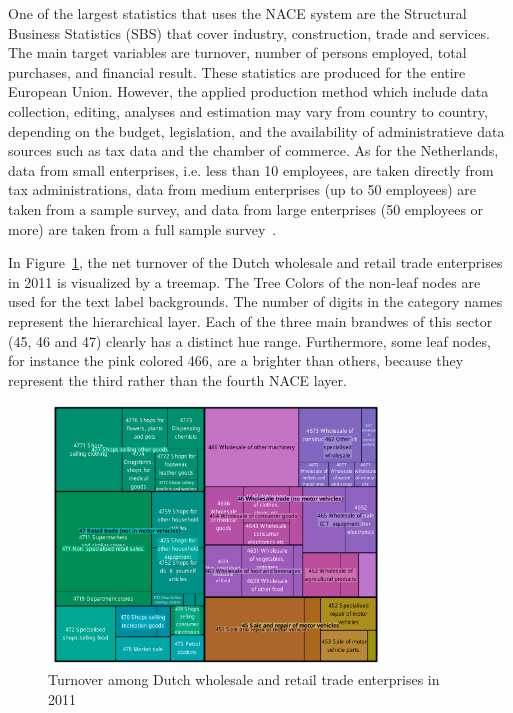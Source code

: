 \documentclass[journal]{vgtc}                %
\begin{document}
One of the largest statistics that uses the NACE system are the Structural Business Statistics (SBS) that cover industry, construction, trade and services. The main target variables are turnover, number of persons employed, total purchases, and financial result. These statistics are produced for the entire European Union. However, the applied production method which include data collection, editing, analyses and estimation may vary from country to country, depending on the budget, legislation, and the availability of administratieve data sources such as tax data and the chamber of commerce. As for the Netherlands, data from small enterprises, i.e. less than 10 employees, are taken directly from tax administrations, data from medium enterprises (up to 50 employees) are taken from a sample survey, and data from large enterprises (50 employees or more) are taken from a full sample survey~\cite{cbsSBS}.


In Figure~\ref{fig:treemapApp}, the net turnover of the Dutch wholesale and retail trade enterprises in 2011 is visualized by a treemap. The Tree Colors of the non-leaf nodes are used for the text label backgrounds. The number of digits in the category names represent the hierarchical layer. Each of the three main brandwes of this sector (45, 46 and 47) clearly has a distinct hue range. Furthermore, some leaf nodes, for instance the pink colored 466, are a brighter than others, because they represent the third rather than the fourth NACE layer.


\begin{figure}[tb]
  \centering
  \includegraphics[width=3.5in]{TMbusiness.pdf}
  \caption{Turnover among Dutch wholesale and retail trade enterprises in 2011}\label{fig:treemapApp}
\end{figure}
\end{document}
